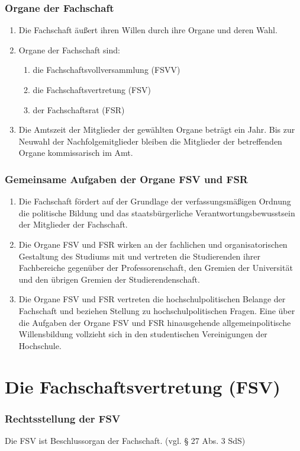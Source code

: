 \documentclass{article}
\begin{document}
\section{Organe der Fachschaft}
\begin{enumerate}[(1)]
\item Die Fachschaft äußert ihren Willen durch ihre Organe und deren Wahl.
\item Organe der Fachschaft sind:
\begin{enumerate}[1.]
    \item die Fachschaftsvollversammlung (FSVV)
    \item die Fachschaftsvertretung (FSV)
    \item der Fachschaftsrat (FSR)
\end{enumerate}
\item Die Amtszeit der Mitglieder der gewählten Organe beträgt ein Jahr. Bis zur Neuwahl der Nachfolgemitglieder bleiben die Mitglieder der betreffenden Organe kommissarisch im Amt.
\end{enumerate}

\section{Gemeinsame Aufgaben der Organe FSV und FSR}
\begin{enumerate}[(1)]
\item Die Fachschaft fördert auf der Grundlage der verfassungsmäßigen Ordnung die politische Bildung und das staatsbürgerliche Verantwortungsbewusstsein der Mitglieder der Fachschaft.
\item Die Organe FSV und FSR wirken an der fachlichen und organisatorischen Gestaltung des Studiums mit und vertreten die Studierenden ihrer Fachbereiche gegenüber der Professorenschaft, den Gremien der Universität und den übrigen Gremien der Studierendenschaft.
\item Die Organe FSV und FSR vertreten die hochschulpolitischen Belange der Fachschaft und beziehen Stellung zu hochschulpolitischen Fragen. Eine über die Aufgaben der Organe FSV und FSR hinausgehende allgemeinpolitische Willensbildung vollzieht sich in den studentischen Vereinigungen der Hochschule.
\end{enumerate}

\part{Die Fachschaftsvertretung (FSV)}
\section{Rechtsstellung der FSV}
Die FSV ist Beschlussorgan der Fachschaft. (vgl. § 27 Abs. 3 SdS)
\end{document}
